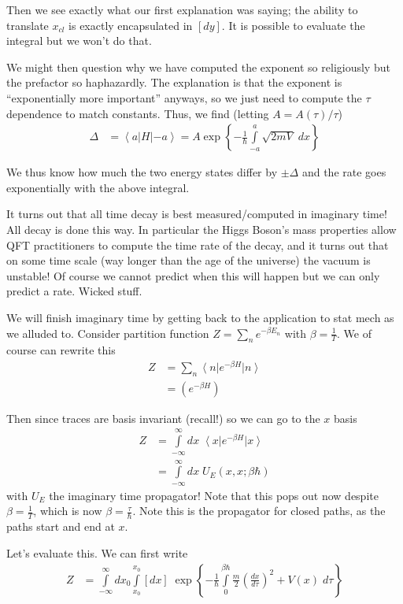 \documentclass[10pt]{report}
\newcommand{\bra}[1]{\left<#1\right|}
\newcommand{\ket}[1]{\left|#1\right>}
\newcommand{\rd}[2]{\frac{d#1}{d#2}}
\begin{document}
Then we see exactly what our first explanation was saying; the ability to translate $x_{cl}$ is exactly encapsulated in $[dy]$. It is possible to evaluate the integral but we won't do that.

We might then question why we have computed the exponent so religiously but the prefactor so haphazardly. The explanation is that the exponent is ``exponentially more important'' anyways, so we just need to compute the $\tau$ dependence to match constants. Thus, we find (letting $A = A(\tau)/\tau$)
\begin{align}
    \Delta &= \bra{a}H\ket{-a} = A\exp\left\{ -\frac{1}{\hbar}\int\limits_{-a}^{a}\sqrt{2mV}\;dx \right\}
\end{align}

We thus know how much the two energy states differ by $\pm \Delta$ and the rate goes exponentially with the above integral.

It turns out that all time decay is best measured/computed in imaginary time! All decay is done this way. In particular the Higgs Boson's mass properties allow QFT practitioners to compute the time rate of the decay, and it turns out that on some time scale (way longer than the age of the universe) the vacuum is unstable! Of course we cannot predict when this will happen but we can only predict a rate. Wicked stuff.

We will finish imaginary time by getting back to the application to stat mech as we alluded to. Consider partition function $Z = \sum_{n}^{}e^{-\beta E_n}$ with $\beta = \frac{1}{T}$. We of course can rewrite this
\begin{align}
    Z  &=\sum_{n}^{}\bra{n}e^{-\beta H}\ket{n}\\
    &=  \left(e^{-\beta H}\right)
\end{align}

Then since traces are basis invariant (recall!) so we can go to the $x$ basis
\begin{align}
    Z &= \int\limits_{-\infty}^{\infty}dx\;\bra{x}e^{-\beta H}\ket{x}\\
    &= \int\limits_{-\infty}^{\infty}dx\; U_E(x,x; \beta\hbar)
\end{align}
with $U_E$ the imaginary time propagator! Note that this pops out now despite $\beta = \frac{1}{T}$, which is now $\beta = \frac{\tau}{\hbar}$. Note this is the propagator for closed paths, as the paths start and end at $x$.

Let's evaluate this. We can first write
\begin{align}
    Z &= \int\limits_{-\infty}^{\infty}dx_0\int\limits_{x_0}^{x_0}[dx]\;\exp\left\{ -\frac{1}{\hbar}\int\limits_{0}^{\beta\hbar}\frac{m}{2}\left( \rd{x}{\tau} \right)^2 + V(x)\; d\tau \right\}
\end{align}
\end{document}
